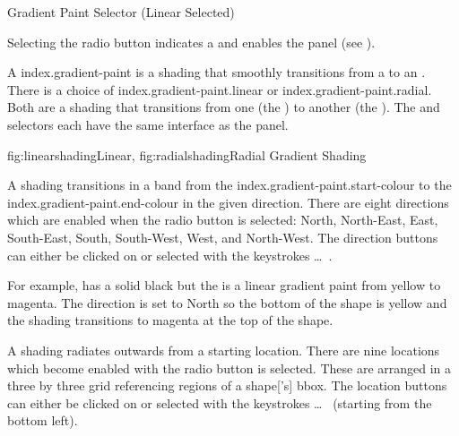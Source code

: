 
{}
{Gradient Paint Selector (Linear Selected)}

Selecting the  radio button indicates a 
 and enables the
 panel (see
). 

A \gls{index.gradient-paint} is a shading that smoothly transitions
from a  to an
.  There is a choice
of \gls{index.gradient-paint.linear} or
\gls{index.gradient-paint.radial}. Both are a shading that
transitions from one  (the
) to another (the
).  The
 and  selectors
each have the same interface as the  panel.

{
 {fig:linearshading}{}{Linear},
 {fig:radialshading}{}{Radial}
}
{Gradient Shading}


A  shading transitions in
a band from the \gls{index.gradient-paint.start-colour} to the
\gls{index.gradient-paint.end-colour} in the given direction. There
are eight directions which are enabled when the
 radio button is selected: North, North-East,
East, South-East, South, South-West, West, and North-West.  The
direction buttons can either be clicked on or selected with the
keystrokes  \ldots\
.

For example,  has a solid black
 but the  is a linear
gradient paint from yellow to magenta. The direction is set to North
so the bottom of the shape is yellow and the shading transitions to
magenta at the top of the shape.


A  shading radiates
outwards from a starting location. There are nine locations which
become enabled with the \widget{paintselector.radial} radio button is
selected. These are arranged in a three by three grid referencing
regions of a \gls*{shape}['s] \gls{bbox}.
The location buttons can either be clicked on or
selected with the keystrokes  \ldots\
 (starting from the bottom left).

